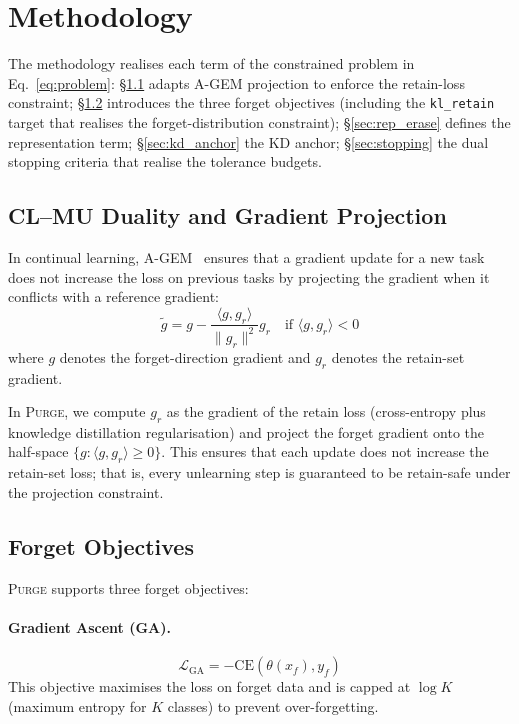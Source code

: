 \documentclass{article}
\newcommand{\ours}{\textsc{Purge}}
\newcommand{\klr}{\texttt{kl\_retain}}
\newcommand{\new}[1]{{\color{orange}#1}}
\begin{document}

\section{Methodology}\label{sec:method}

\new{The methodology realises each term of the constrained problem in Eq.~\ref{eq:problem}: \S\ref{sec:cl_mu} adapts A-GEM projection to enforce the retain-loss constraint; \S\ref{sec:forget_obj} introduces the three forget objectives (including the \klr{} target that realises the forget-distribution constraint); \S\ref{sec:rep_erase} defines the representation term; \S\ref{sec:kd_anchor} the KD anchor; \S\ref{sec:stopping} the dual stopping criteria that realise the tolerance budgets.}

\subsection{CL--MU Duality and Gradient Projection}\label{sec:cl_mu}

In continual learning, A-GEM~\cite{chaudhry2019agem} ensures that a gradient update for a new task does not increase the loss on previous tasks by projecting the gradient when it conflicts with a reference gradient:
\begin{equation}\label{eq:projection}
\tilde{g} = g - \frac{\langle g, g_r \rangle}{\|g_r\|^2} g_r \quad \text{if } \langle g, g_r \rangle < 0
\end{equation}
where $g$ denotes the forget-direction gradient and $g_r$ denotes the retain-set gradient.

In \ours{}, we compute $g_r$ as the gradient of the retain loss (cross-entropy plus knowledge distillation regularisation) and project the forget gradient onto the half-space $\{g : \langle g, g_r \rangle \geq 0\}$.
This ensures that each update does not increase the retain-set loss; that is, every unlearning step is guaranteed to be retain-safe under the projection constraint.

\subsection{Forget Objectives}\label{sec:forget_obj}

\ours{} supports three forget objectives:

\paragraph{Gradient Ascent (GA).}
\begin{equation}
\mathcal{L}_{\text{GA}} = -\text{CE}(\theta(x_f), y_f)
\end{equation}
This objective maximises the loss on forget data and is capped at $\log K$ (maximum entropy for $K$ classes) to prevent over-forgetting.
\end{document}
